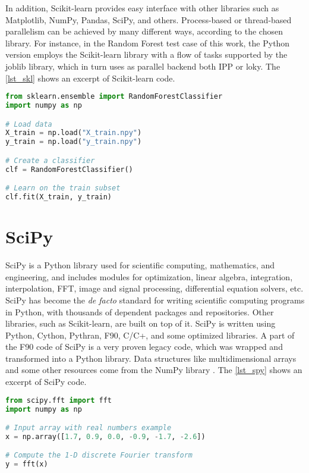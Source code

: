 In addition, Scikit-learn provides easy interface with other libraries such as Matplotlib, NumPy, Pandas, SciPy, and others. Process-based or thread-based parallelism can be achieved by many different ways, according to the chosen library. For instance, in the Random Forest test case of this work, the Python version employs the Scikit-learn library with a flow of tasks supported by the joblib library, which in turn uses as parallel backend both IPP or loky. The \autoref {lst_skl} shows an excerpt of Scikit-learn code.

\begin{lstlisting}[float=htb, language={Python}, label={lst_skl}, caption={Excerpt of Scikit-learn code.}]
from sklearn.ensemble import RandomForestClassifier
import numpy as np

# Load data
X_train = np.load("X_train.npy")
y_train = np.load("y_train.npy")

# Create a classifier
clf = RandomForestClassifier()

# Learn on the train subset
clf.fit(X_train, y_train)
\end{lstlisting}

%
%
%
\section{SciPy}
\label{sec_scipy}

SciPy is a Python library used for scientific computing, mathematics, and engineering, and includes modules for optimization, linear algebra, integration, interpolation, FFT, image and signal processing, differential equation solvers, etc. SciPy has become the \textit {de facto} standard for writing scientific computing programs in Python, with thousands of dependent packages and repositories. Other libraries, such as Scikit-learn, are built on top of it. SciPy is written using Python, Cython, Pythran, F90, C/C+, and some optimized libraries. A part of the F90 code of SciPy is a very proven legacy code, which was wrapped and transformed into a Python library. Data structures like multidimensional arrays and some other resources come from the NumPy library \cite {Virtanen2020}. The \autoref {lst_spy} shows an excerpt of SciPy code.

\begin{lstlisting}[float=htb, language={Python}, label={lst_spy}, caption={Excerpt of SciPy code.}]
from scipy.fft import fft
import numpy as np

# Input array with real numbers example
x = np.array([1.7, 0.9, 0.0, -0.9, -1.7, -2.6])

# Compute the 1-D discrete Fourier transform
y = fft(x)
\end{lstlisting}

